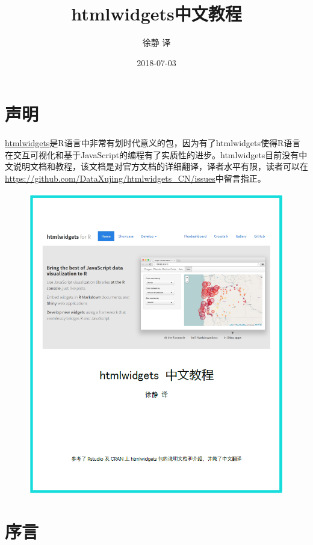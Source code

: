 \documentclass[]{book}
\title{htmlwidgets中文教程}
\author{徐静 译}
\date{2018-07-03}
\theoremstyle{definition}
\theoremstyle{definition}
\theoremstyle{definition}
\theoremstyle{remark}
\begin{document}
\maketitle

{
\setcounter{tocdepth}{1}
\tableofcontents
}
\chapter*{声明}

\href{https://CRAN.R-project.org/package=htmlwidgets}{htmlwidgets}是R语言中非常有划时代意义的包，因为有了htmlwidgets使得R语言在交互可视化和基于JavaScript的编程有了实质性的进步。htmlwidgets目前没有中文说明文档和教程，该文档是对官方文档的详细翻译，译者水平有限，读者可以在\url{https://github.com/DataXujing/htmlwidgets_CN/issues}中留言指正。

\begin{figure}
\centering
\includegraphics{pic/cover.png}
\caption{}
\end{figure}

\chapter*{序言}
\end{document}
